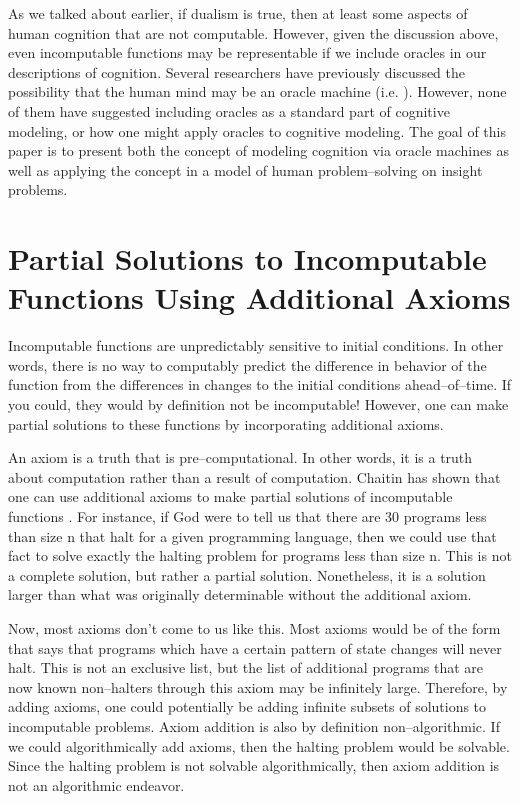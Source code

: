As we talked about earlier, if dualism is true, then at least some aspects of human cognition that are not computable.  However, given the discussion above, even incomputable functions may be representable if we include oracles in our descriptions of cognition.  Several researchers have previously discussed the possibility that the human mind may be an oracle machine (i.e. \citet{copeland1998}).  However, none of them have suggested including oracles as a standard part of cognitive modeling, or how one might apply oracles to cognitive modeling.  The goal of this paper is to present both the concept of modeling cognition via oracle machines as well as applying the concept in a model of human problem--solving on insight problems.

\section[Partial Solutions to Incomputable Functions]{Partial Solutions to Incomputable Functions Using Additional Axioms}

Incomputable functions are unpredictably sensitive to initial conditions.  In other words, there is no way to computably predict the difference in behavior of the function from the differences in changes to the initial conditions ahead--of--time.  If you could, they would by definition not be incomputable!  However, one can make partial solutions to these functions by incorporating additional axioms.

An axiom is a truth that is pre--computational.  In other words, it is a truth about computation rather than a result of computation.  Chaitin has shown that one can use additional axioms to make partial solutions of incomputable functions \citep{chaitin1982}.  For instance, if God were to tell us that there are 30 programs less than size n that halt for a given programming language, then we could use that fact to solve exactly the halting problem for programs less than size n.  This is not a complete solution, but rather a partial solution.  Nonetheless, it is a solution larger than what was originally determinable without the additional axiom.

Now, most axioms don't come to us like this.  Most axioms would be of the form that says that programs which have a certain pattern of state changes will never halt.  This is not an exclusive list, but the list of additional programs that are now known non--halters through this axiom may be infinitely large.  Therefore, by adding axioms, one could potentially be adding infinite subsets of solutions to incomputable problems.  Axiom addition is also by definition non--algorithmic.  If we could algorithmically add axioms, then the halting problem would be solvable.  Since the halting problem is not solvable algorithmically, then axiom addition is not an algorithmic endeavor.

